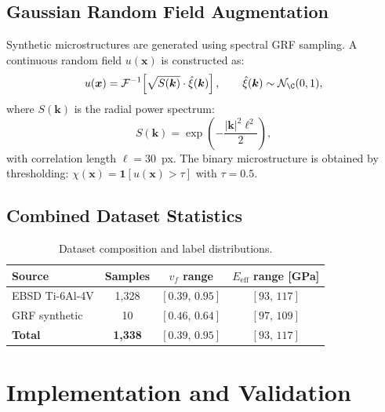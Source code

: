 \documentclass[12pt,a4paper]{article}
\newcommand{\N}{\mathcal{N}}
\newcommand{\vf}{v_f}
\newcommand{\Eeff}{E_{\mathrm{eff}}}
\newcommand{\xvec}{\bm{x}}
\theoremstyle{definition}
\begin{document}
\subsection{Gaussian Random Field Augmentation}

Synthetic microstructures are generated using spectral GRF sampling.  A
continuous random field $u(\xvec)$ is constructed as:
\begin{equation}
  u(\xvec) = \mathcal{F}^{-1}\!\left[
    \sqrt{S(\bm{k})} \cdot \hat{\xi}(\bm{k})
  \right],
  \qquad \hat{\xi}(\bm{k}) \sim \N_\C(0, 1),
  \label{eq:grf}
\end{equation}
where $S(\bm{k})$ is the radial power spectrum:
\begin{equation}
  S(\bm{k}) = \exp\!\left(-\frac{|\bm{k}|^2 \ell^2}{2}\right),
  \label{eq:power_spectrum}
\end{equation}
with correlation length $\ell = 30$~px.  The binary microstructure is obtained
by thresholding: $\chi(\xvec) = \mathbf{1}[u(\xvec) > \tau]$ with $\tau = 0.5$.

\subsection{Combined Dataset Statistics}

\begin{table}[h]
  \centering
  \caption{Dataset composition and label distributions.}
  \label{tab:dataset}
  \begin{tabular}{lccc}
    \toprule
    Source & Samples & $\vf$ range & $\Eeff$ range [GPa] \\
    \midrule
    EBSD Ti-6Al-4V & 1{,}328 & $[0.39,\, 0.95]$ & $[93,\, 117]$ \\
    GRF synthetic  & 10      & $[0.46,\, 0.64]$ & $[97,\, 109]$ \\
    \midrule
    \textbf{Total} & \textbf{1{,}338} & $[0.39,\, 0.95]$ & $[93,\, 117]$ \\
    \bottomrule
  \end{tabular}
\end{table}

\section{Implementation and Validation}
\label{sec:implementation}
\end{document}
